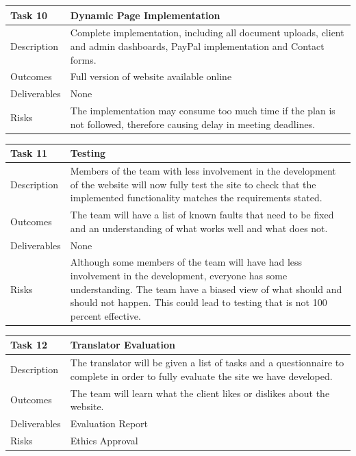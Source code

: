 \documentclass{l3proj}
\begin{document}
\begin{center}
    \begin{tabular}{ | l | p{12cm} |}
    \hline	
    Task 10 & Dynamic Page Implementation \\ \hline
    Description & Complete implementation, including all document uploads, client and admin dashboards, PayPal implementation and Contact forms. \\ \hline   
    Outcomes & Full version of website available online \\ \hline
    Deliverables & None \\ \hline
    Risks & The implementation may consume too much time if the plan is not followed, therefore causing delay in meeting deadlines. \\ 
    \hline
    \end{tabular}
\end{center}

\begin{center}
    \begin{tabular}{ | l | p{12cm} |}
    \hline	
    Task 11 & Testing \\ \hline
    Description & Members of the team with less involvement in the development of the website will now fully test the site to check that the implemented functionality matches the requirements stated. \\ \hline   
    Outcomes & The team will have a list of known faults that need to be fixed and an understanding of what works well and what does not. \\ \hline
    Deliverables & None \\ \hline
    Risks & Although some members of the team will have had less involvement in the development, everyone has some understanding. The team have a biased view of what should and should not happen. This could lead to testing that is not 100 percent effective. \\ 
    \hline
    \end{tabular}
\end{center}

\begin{center}
    \begin{tabular}{ | l | p{12cm} |}
    \hline	
    Task 12 & Translator Evaluation \\ \hline
    Description & The translator will be given a list of tasks and a questionnaire to complete in order to fully evaluate the site we have developed. \\ \hline   
    Outcomes & The team will learn what the client likes or dislikes about the website. \\ \hline
    Deliverables & Evaluation Report \\ \hline
    Risks & Ethics Approval \\ 
    \hline
    \end{tabular}
\end{center}
\end{document}
